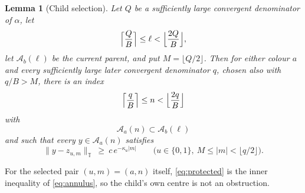 \documentclass[11pt,reqno]{amsart}
\theoremstyle{plain}
\newtheorem{lemma}[theorem]{Lemma}
\theoremstyle{definition}
\theoremstyle{remark}
\numberwithin{equation}{section}
\begin{document}
\begin{lemma}[Child selection]
  \label{lem:child}
  Let $Q$ be a sufficiently large convergent denominator of $\alpha$, let
  \begin{equation*}
    \Bigl\lceil\frac QB\Bigr\rceil\le\ell<\Bigl\lfloor\frac{2Q}B\Bigr\rfloor,
  \end{equation*}
  let $\mathcal A_b(\ell)$ be the current parent, and put
  $M=\lfloor Q/2\rfloor$. Then for either colour $a$ and every
  sufficiently large later convergent denominator $q$, chosen also with
  $q/B>M$, there is an index
  \begin{equation}
    \label{eq:child-index}
    \Bigl\lceil\frac qB\Bigr\rceil\le n<\Bigl\lfloor\frac{2q}B\Bigr\rfloor
  \end{equation}
  with
  \begin{equation}
    \label{eq:nested}
    \mathcal A_a(n)\subset\mathcal A_b(\ell)
  \end{equation}
  and such that every $y\in\mathcal A_a(n)$ satisfies
  \begin{equation}
    \label{eq:protected}
    \lVert y-z_{u,m}\rVert_{\mathbb T}\ \ge\ c\,e^{-\kappa_u|m|}
    \qquad
    \bigl(u\in\{0,1\},\ M\le|m|<\lfloor q/2\rfloor\bigr).
  \end{equation}
\end{lemma}

For the selected pair $(u,m)=(a,n)$ itself, \eqref{eq:protected} is the
inner inequality of \eqref{eq:annulus}, so the child's own centre is not an
obstruction.
\end{document}
